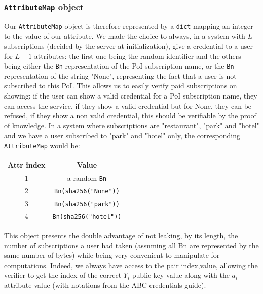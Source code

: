 \documentclass[10pt,conference,compsocconf]{IEEEtran}
\begin{document}
\subsubsection{\texttt{AttributeMap} object}
Our \texttt{AttributeMap} object is therefore represented by a \texttt{dict} mapping an integer to the value of our attribute. We made the choice to always, in a system with $L$ subscriptions (decided by the server at initialization), give a credential to a user for $L+1$ attributes: the first one being the random identifier and the others being either the \texttt{Bn} representation of the PoI subscription name, or the \texttt{Bn} representation of the string "None", representing the fact that a user is not subscribed to this PoI. This allows us to easily verify paid subscriptions on showing: if the user can show a valid credential for a PoI subscription name, they can access the service, if they show a valid credential but for None, they can be refused, if they show a non valid credential, this should be verifiable by the proof of knowledge. In a system where subscriptions are "restaurant", "park" and "hotel" and we have a user subscribed to "park" and "hotel" only, the corresponding \texttt{AttributeMap} would be:
\begin{center}
\begin{tabular}{||c c||} 
 \hline
 Attr index & Value \\ [0.5ex] 
 \hline\hline
 1 & a random \texttt{Bn} \\ 
 \hline
 2 & \texttt{Bn(sha256("None"))} \\
 \hline
 3 & \texttt{Bn(sha256("park"))} \\
 \hline
 4 & \texttt{Bn(sha256("hotel"))} \\
 \hline
\end{tabular}
\end{center}
This object presents the double advantage of not leaking, by its length, the number of subscriptions a user had taken (assuming all Bn are represented by the same number of bytes) while being very convenient to manipulate for computations. Indeed, we always have access to the pair index,value, allowing the verifier to get the index of the correct $Y_i$ public key value along with the $a_i$ attribute value (with notations from the ABC credentials guide).
\end{document}
